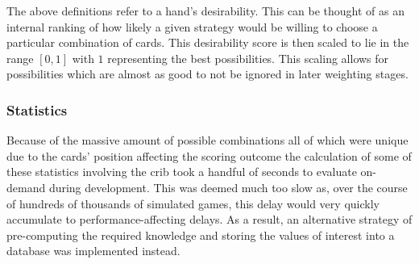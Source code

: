 %
The above definitions refer to a hand's desirability.
%
This can be thought of as an internal ranking of how likely a given strategy
would be willing to choose a particular combination of cards.
%
This desirability score is then scaled to lie in the range $[0, 1]$ with
$1$ representing the best possibilities.
%
This scaling allows for possibilities which are almost as good to not be
ignored in later weighting stages.


\subsubsection*{Statistics}

Because of the massive amount of possible combinations%
\textemdash all of which were unique due to the cards' position affecting the
scoring outcome\textemdash%
the calculation of some of these statistics involving the crib
took a handful of seconds to evaluate on-demand during development.
%
This was deemed much too slow as,
over the course of hundreds of thousands of simulated games,
this delay would very quickly accumulate to performance-affecting delays.
%
As a result, an alternative strategy of pre-computing the required knowledge and
storing the values of interest into a database was implemented instead.

